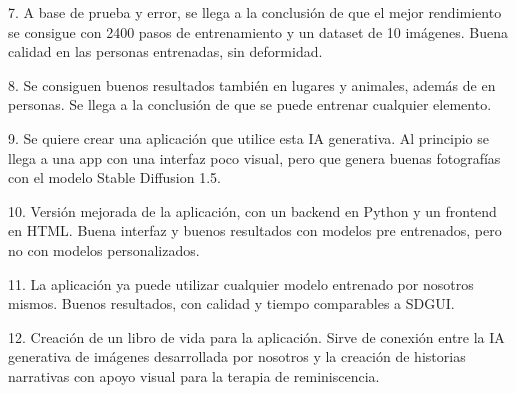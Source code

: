 7. A base de prueba y error, se llega a la conclusión de que el mejor rendimiento se consigue con 2400 pasos de entrenamiento y un dataset de 10 imágenes. Buena calidad en las personas entrenadas, sin deformidad.

8. Se consiguen buenos resultados también en lugares y animales, además de en personas. Se llega a la conclusión de que se puede entrenar cualquier elemento.

9. Se quiere crear una aplicación que utilice esta IA generativa. Al principio se llega a una app con una interfaz poco visual, pero que genera buenas fotografías con el modelo Stable Diffusion 1.5.

10. Versión mejorada de la aplicación, con un backend en Python y un frontend en HTML. Buena interfaz y buenos resultados con modelos pre entrenados, pero no con modelos personalizados.

11. La aplicación ya puede utilizar cualquier modelo entrenado por nosotros mismos. Buenos resultados, con calidad y tiempo comparables a SDGUI.

12. Creación de un libro de vida para la aplicación. Sirve de conexión entre la IA generativa de imágenes desarrollada por nosotros y la creación de historias narrativas con apoyo visual para la terapia de reminiscencia.


